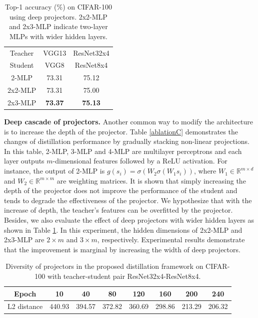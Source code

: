 \documentclass{article}
\begin{document}
\begin{table}
    \setlength{\abovecaptionskip}{-0.45cm}
    \setlength{\belowcaptionskip}{0.2cm}
    \caption{Top-1 accuracy ($\%$)  on CIFAR-100 using deep projectors. 2x2-MLP and 2x3-MLP indicate two-layer MLPs with wider hidden layers.}
    \label{widerproj}
    \centering
    \begin{tabular}{c|c|c} 
		\hline
		Teacher &VGG13 &{ResNet32x4} \\
		Student &VGG8 &{ResNet8x4} \\
		\hline 
		2-MLP &73.31   &75.12\\
		2x2-MLP &73.31   &75.00\\
		2x3-MLP &\textbf{73.37}  &\textbf{75.13}\\
		\hline
    \end{tabular}
\end{table}
\textbf{Deep cascade of projectors. }Another common way to modify the architecture is to increase the depth of the projector. Table \ref{ablationC} demonstrates the changes of distillation performance by gradually stacking non-linear projections. In this table, 2-MLP, 3-MLP and 4-MLP are multilayer perceptrons and each layer outputs $m$-dimensional features followed by a ReLU activation. For instance, the output of 2-MLP is $g(s_i)=\sigma(W_2\sigma(W_1s_i))$, where $W_1 \in \mathbb{R}^{m\times d}$ and $W_2 \in \mathbb{R}^{m\times m}$ are weighting matrices. It is shown that simply increasing the depth of the projector does not improve the performance of the student and tends to degrade the effectiveness of the projector. We hypothesize that with the increase of depth, the teacher's features can be overfitted by the projector. Besides, we also evaluate the effect of deep projectors with wider hidden layers as shown in Table \ref{widerproj}. In this experiment, the hidden dimensions of 2x2-MLP and 2x3-MLP are $2\times m$ and $3\times m$, respectively. Experimental results demonstrate that the improvement is marginal by increasing the width of deep projectors. %

\begin{table}[t]
    \caption{Diversity of projectors in the proposed distillation framework on CIFAR-100 with teacher-student pair ResNet32x4-ResNet8x4.}
    \label{diversityofP}
    \centering
    \begin{tabular}{c|ccccccc}
    \hline
    Epoch &10 &40 &80 &120 &160 &200 &240  \\
    \hline 
    L2 distance &440.93 &394.57	 &372.82 &360.69 &298.86 &213.29 &206.32       \\
    \hline
    \end{tabular}
\end{table}
\end{document}

